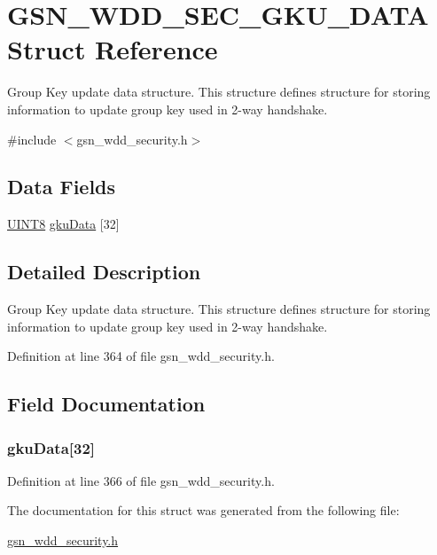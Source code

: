 \hypertarget{a00291}{
\section{GSN\_\-WDD\_\-SEC\_\-GKU\_\-DATA Struct Reference}
\label{a00291}
}


Group Key update data structure. This structure defines structure for storing information to update group key used in 2-\/way handshake.  




{\ttfamily \#include $<$gsn\_\-wdd\_\-security.h$>$}

\subsection*{Data Fields}
\begin{DoxyCompactItemize}
\item 
\hyperlink{a00660_gab27e9918b538ce9d8ca692479b375b6a}{UINT8} \hyperlink{a00291_a907bcf5dc3618acb66117c1c968e96c1}{gkuData} \mbox{[}32\mbox{]}
\end{DoxyCompactItemize}


\subsection{Detailed Description}
Group Key update data structure. This structure defines structure for storing information to update group key used in 2-\/way handshake. 

Definition at line 364 of file gsn\_\-wdd\_\-security.h.



\subsection{Field Documentation}
\hypertarget{a00291_a907bcf5dc3618acb66117c1c968e96c1}{
\subsubsection[{gkuData}]{ {\bf gkuData}\mbox{[}32\mbox{]}}}
\label{a00291_a907bcf5dc3618acb66117c1c968e96c1}


Definition at line 366 of file gsn\_\-wdd\_\-security.h.



The documentation for this struct was generated from the following file:\begin{DoxyCompactItemize}
\item 
\hyperlink{a00604}{gsn\_\-wdd\_\-security.h}\end{DoxyCompactItemize}
